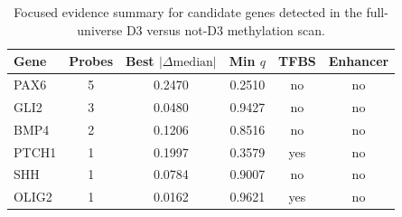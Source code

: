 \begin{table}[htbp]
\centering
\caption{Focused evidence summary for candidate genes detected in the full-universe D3 versus not-D3 methylation scan.}
\label{tab:focused_candidate_evidence}
\begin{tabular}{lccccc}
\hline
Gene & Probes & Best $|\Delta \mathrm{median}|$ & Min $q$ & TFBS & Enhancer \\
\hline
PAX6 & 5 & 0.2470 & 0.2510 & no & no \\
GLI2 & 3 & 0.0480 & 0.9427 & no & no \\
BMP4 & 2 & 0.1206 & 0.8516 & no & no \\
PTCH1 & 1 & 0.1997 & 0.3579 & yes & no \\
SHH & 1 & 0.0784 & 0.9007 & no & no \\
OLIG2 & 1 & 0.0162 & 0.9621 & yes & no \\
\hline
\end{tabular}
\end{table}
